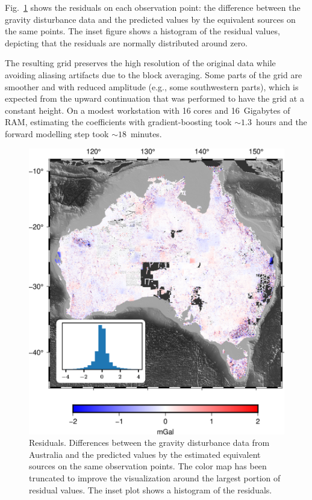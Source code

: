 Fig.~\ref{fig:australia-residuals} shows the residuals on each observation
point: the difference between the gravity disturbance data and the predicted
values by the equivalent sources on the same points.
The inset figure shows a histogram of the residual values, depicting that the
residuals are normally distributed around zero.

The resulting grid preserves the high resolution of the original data while
avoiding aliasing artifacts due to the block averaging.
Some parts of the grid are smoother and with reduced amplitude (e.g., some
southwestern parts), which is expected from the upward continuation that was
performed to have the grid at a constant height.
On a modest workstation with 16 cores and 16~Gigabytes of RAM,
estimating the \AustraliaEqlNSources{} coefficients with gradient-boosting took
$\sim 1.3$~hours and the forward modelling step took $\sim 18$~minutes.

\begin{figure}
    \includegraphics[width=\linewidth]{figs/australia-residuals.png}
    \caption{
        Residuals. Differences between the gravity disturbance data from
        Australia and the predicted values by the estimated equivalent sources
        on the same observation points. The color map has been truncated to
        improve the visualization around the largest portion of residual
        values. The inset plot shows a histogram of the residuals.
    }
    \label{fig:australia-residuals}
\end{figure}


